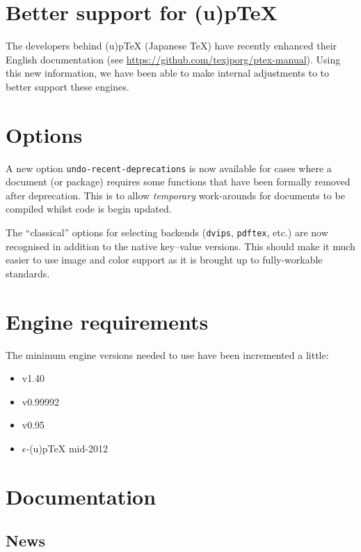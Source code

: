 \documentclass{ltnews}
\begin{document}
\section{Better support for (u)p\TeX{}}

The developers behind (u)p\TeX{} (Japanese \TeX{}) have recently enhanced their
English documentation (see \url{https://github.com/texjporg/ptex-manual}).
Using this new information, we have been able to make internal adjustments to
 to better support these engines.

\section{Options}

A new option \texttt{undo-recent-deprecations} is now available for cases where
a document (or package) requires some  functions that have been
formally removed after deprecation. This is to allow \emph{temporary}
work-arounds for documents to be compiled whilst code is begin updated.

The \enquote{classical} options for selecting backends (\texttt{dvips},
\texttt{pdftex}, etc.) are now recognised in addition to the native key--value
versions. This should make it much easier to use  image and color
support as it is brought up to fully-workable standards.

\section{Engine requirements}

The minimum engine versions needed to use  have been
incremented a little:
\begin{itemize}
  \item {} v1.40
  \item {} v0.99992
  \item {} v0.95
  \item $\epsilon$-(u)p\TeX{} mid-2012
\end{itemize}

\section{Documentation}

\subsection{News}
\end{document}
